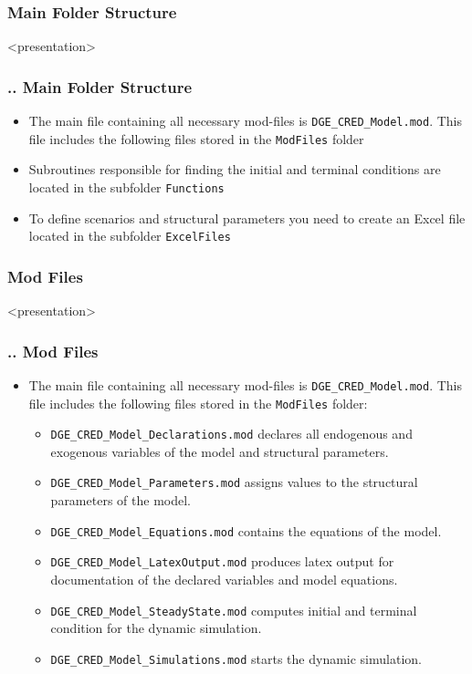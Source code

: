 \documentclass[11pt,aspectratio=169]{beamer}
\begin{document}
\subsubsection{Main Folder Structure}
\begin{frame}<presentation>
\frametitle{{\thesection.\thesubsection.\thesubsubsection} Main Folder Structure}
\begin{itemize}
\item The main file containing all necessary mod-files is {\tt DGE\_CRED\_Model.mod}. This file includes the following files stored in the {\tt ModFiles} folder
\item Subroutines responsible for finding the initial and terminal conditions are located in the subfolder {\tt Functions}
\item To define scenarios and structural parameters you need to create an Excel file located in the subfolder {\tt ExcelFiles}
\end{itemize}
\end{frame}

\subsubsection{Mod Files}
\begin{frame}<presentation>
\frametitle{{\thesection.\thesubsection.\thesubsubsection} Mod Files}
\begin{itemize}
\item The main file containing all necessary mod-files is {\tt DGE\_CRED\_Model.mod}. This file includes the following files stored in the {\tt ModFiles} folder:
\begin{itemize}
\item {\tt DGE\_CRED\_Model\_Declarations.mod} declares all endogenous and exogenous variables of the model and structural parameters.
\item {\tt DGE\_CRED\_Model\_Parameters.mod} assigns values to the structural parameters of the model.
\item {\tt DGE\_CRED\_Model\_Equations.mod} contains the equations of the model.
\item {\tt DGE\_CRED\_Model\_LatexOutput.mod} produces latex output for documentation of the declared variables and model equations.
\item {\tt DGE\_CRED\_Model\_SteadyState.mod} computes initial and terminal condition for the dynamic simulation.
\item {\tt DGE\_CRED\_Model\_Simulations.mod} starts the dynamic simulation.
\end{itemize}
\end{itemize}
\end{frame}
\end{document}
